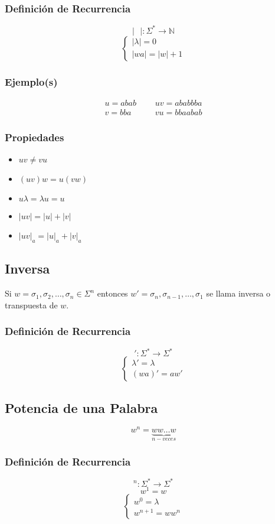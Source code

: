 \subsubsection{Definición de Recurrencia}
$$|\text{ }|:\Sigma^*\rightarrow\mathbb{N}$$
$$
\begin{cases}
|\lambda |=0 \\
|wa| = |w| + 1
\end{cases}
$$
\subsubsection{Ejemplo(s)}
\begin{align*}
u=abab & \text{ } &uv=ababbba \\
v=bba  & \text{ } & vu=bbaabab
\end{align*}
\subsubsection{Propiedades}
\begin{itemize}
\item $uv\neq vu$
\item $(uv)w=u(vw)$
\item $u\lambda=\lambda u=u$
\item $|uv|=|u|+|v|$
\item $|uv|_a = |u|_a + |v|_a$
\end{itemize}
\subsection{Inversa}
Si $w=\sigma_1,\sigma_2,\ldots ,\sigma_n \in\Sigma^n$ entonces $w'=\sigma_n,\sigma_{n-1},\ldots ,\sigma_1$ se llama inversa o transpuesta de $w$.
\subsubsection*{Definición de Recurrencia}
$$':\Sigma^*\rightarrow\Sigma^*$$
$$
\begin{cases}
\lambda'=\lambda \\
(wa)' = aw'
\end{cases}
$$
\subsection{Potencia de una Palabra}
$$w^n =  \underbrace{ww\ldots w}_{n-veces}$$
\subsubsection*{Definición de Recurrencia}
$$^n:\Sigma^*\rightarrow\Sigma^*$$
$$ w^1 = w $$
$$
\begin{cases}
w^0=\lambda \\
w^{n+1} = ww^{n}
\end{cases}
$$
